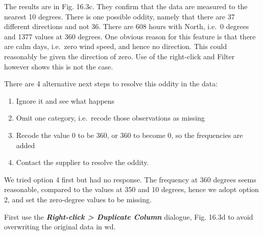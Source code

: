 \documentclass[
  letterpaper,
  DIV=11,
  numbers=noendperiod]{scrreprt}
\begin{document}
The results are in Fig. 16.3c. They confirm that the data are measured
to the nearest 10 degrees. There is one possible oddity, namely that
there are 37 different directions and not 36. There are 608 hours with
North, i.e.~0 degrees and 1377 values at 360 degrees. One obvious reason
for this feature is that there are calm days, i.e.~zero wind speed, and
hence no direction. This could reasonably be given the direction of
zero. Use of the right-click and Filter however shows this is not the
case.

There are 4 alternative next steps to resolve this oddity in the data:

\begin{enumerate}
\def\labelenumi{\arabic{enumi}.}
\item
  Ignore it and see what happens
\item
  Omit one category, i.e.~recode those observations as missing
\item
  Recode the value 0 to be 360, or 360 to become 0, so the frequencies
  are added
\item
  Contact the supplier to resolve the oddity.
\end{enumerate}

We tried option 4 first but had no response. The frequency at 360
degrees seems reasonable, compared to the values at 350 and 10 degrees,
hence we adopt option 2, and set the zero-degree values to be missing.

First use the \textbf{\emph{Right-click \textgreater{} Duplicate
Column}} dialogue, Fig. 16.3d to avoid overwriting the original data in
wd.
\end{document}
